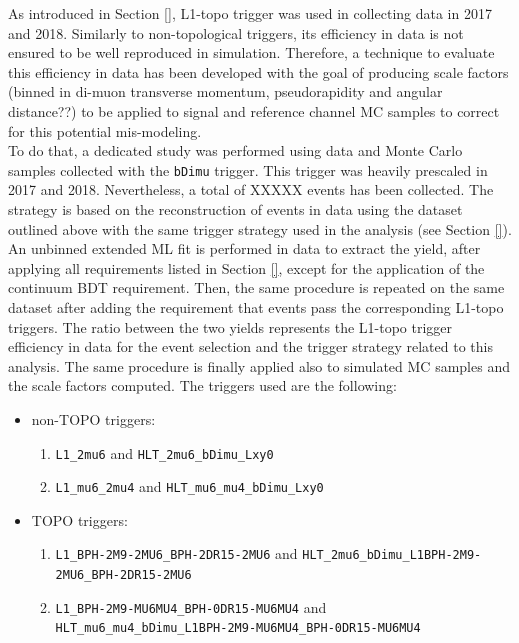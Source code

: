 As introduced in Section \ref{}, L1-topo trigger was used in collecting data in 2017 and 2018. Similarly to non-topological triggers, its efficiency in data is not ensured to be well reproduced in simulation. Therefore, a technique to evaluate this efficiency in data has been developed with the goal of producing scale factors (binned in di-muon transverse momentum, pseudorapidity and angular distance??) to be applied to signal and reference channel MC samples to correct for this potential mis-modeling. \\

 \noindent
 To do that, a dedicated study was performed using data and Monte Carlo samples collected with the \texttt{bDimu} trigger. This trigger was heavily prescaled in 2017 and 2018. Nevertheless, a total of XXXXX events has been collected.
 The strategy is based on the reconstruction of \BpmKpmJpsi events in data using the dataset outlined above with the same trigger strategy used in the analysis (see Section \ref{}). An unbinned extended ML fit is performed in data to extract the \BpmKpmJpsi yield, after applying all requirements listed in Section \ref{}, except for the application of the continuum BDT requirement. Then, the same procedure is repeated on the same dataset after adding the requirement that events pass the corresponding L1-topo triggers. The ratio between the two yields represents the L1-topo trigger efficiency in data for the event selection and the trigger strategy related to this analysis. The same procedure is finally applied also to simulated \BpmKpmJpsi MC samples and the scale factors computed.
 The triggers used are the following:

 \begin{itemize}
    \item non-TOPO triggers:
    \begin{enumerate}
        \item \texttt{L1\_2mu6} and \texttt{HLT\_2mu6\_bDimu\_Lxy0}
        \item \texttt{L1\_mu6\_2mu4} and \texttt{HLT\_mu6\_mu4\_bDimu\_Lxy0}
    \end{enumerate}
    \item TOPO triggers:
    \begin{enumerate}
        \item \texttt{L1\_BPH-2M9-2MU6\_BPH-2DR15-2MU6} and \texttt{HLT\_2mu6\_bDimu\_L1BPH-2M9-2MU6\_BPH-2DR15-2MU6}
        \item \texttt{L1\_BPH-2M9-MU6MU4\_BPH-0DR15-MU6MU4} and \\\texttt{HLT\_mu6\_mu4\_bDimu\_L1BPH-2M9-MU6MU4\_BPH-0DR15-MU6MU4}
    \end{enumerate}
\end{itemize}
 
